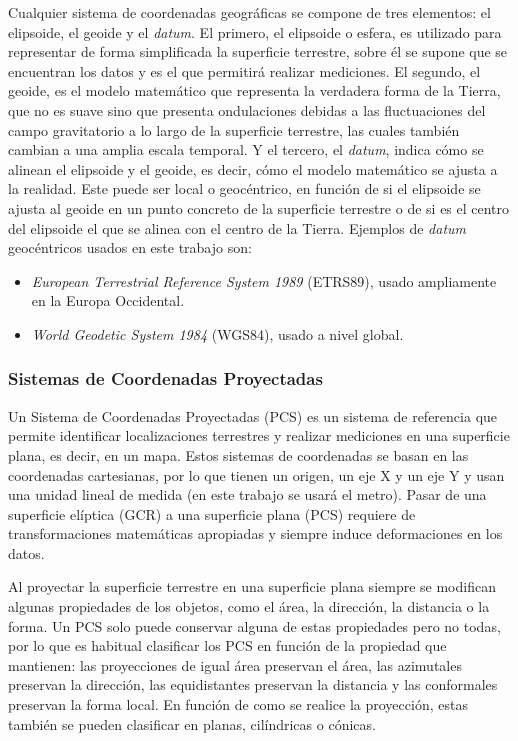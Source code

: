 \documentclass[12pt,a4paper,]{book}
\providecommand{\tightlist}{%
  \setlength{\itemsep}{0pt}\setlength{\parskip}{0pt}}
\numberwithin{dummy}{section}
\theoremstyle{ocrenumbox}
\theoremstyle{blacknumex}
\theoremstyle{blacknumbox}
\theoremstyle{ocrenum}
\theoremstyle{ocrenum}
\begin{document}
Cualquier sistema de coordenadas geográficas se compone de tres
elementos: el elipsoide, el geoide y el \emph{datum}. El primero, el
elipsoide o esfera, es utilizado para representar de forma simplificada
la superficie terrestre, sobre él se supone que se encuentran los datos
y es el que permitirá realizar mediciones. El segundo, el geoide, es el
modelo matemático que representa la verdadera forma de la Tierra, que no
es suave sino que presenta ondulaciones debidas a las fluctuaciones del
campo gravitatorio a lo largo de la superficie terrestre, las cuales
también cambian a una amplia escala temporal. Y el tercero, el
\emph{datum}, indica cómo se alinean el elipsoide y el geoide, es decir,
cómo el modelo matemático se ajusta a la realidad. Este puede ser local
o geocéntrico, en función de si el elipsoide se ajusta al geoide en un
punto concreto de la superficie terrestre o de si es el centro del
elipsoide el que se alinea con el centro de la Tierra. Ejemplos de
\emph{datum} geocéntricos usados en este trabajo son:

\begin{itemize}
\tightlist
\item
  \emph{European Terrestrial Reference System 1989} (ETRS89), usado
  ampliamente en la Europa Occidental.
\item
  \emph{World Geodetic System 1984} (WGS84), usado a nivel global.
  \citep{lovelace_geocomputation_2019}
\end{itemize}

\hypertarget{sistemas-de-coordenadas-proyectadas}{%
\subsubsection*{Sistemas de Coordenadas
Proyectadas}\label{sistemas-de-coordenadas-proyectadas}}

Un Sistema de Coordenadas Proyectadas (PCS) es un sistema de referencia
que permite identificar localizaciones terrestres y realizar mediciones
en una superficie plana, es decir, en un mapa. Estos sistemas de
coordenadas se basan en las coordenadas cartesianas, por lo que tienen
un origen, un eje X y un eje Y y usan una unidad lineal de medida (en
este trabajo se usará el metro). Pasar de una superficie elíptica (GCR)
a una superficie plana (PCS) requiere de transformaciones matemáticas
apropiadas y siempre induce deformaciones en los datos.

Al proyectar la superficie terrestre en una superficie plana siempre se
modifican algunas propiedades de los objetos, como el área, la
dirección, la distancia o la forma. Un PCS solo puede conservar alguna
de estas propiedades pero no todas, por lo que es habitual clasificar
los PCS en función de la propiedad que mantienen: las proyecciones de
igual área preservan el área, las azimutales preservan la dirección, las
equidistantes preservan la distancia y las conformales preservan la
forma local. En función de como se realice la proyección, estas también
se pueden clasificar en planas, cilíndricas o cónicas.
\end{document}
